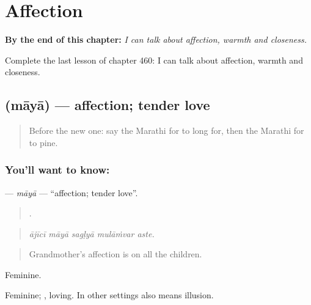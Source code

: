 
\chapter{Affection}
\label{ch:mr-affection}

\begin{chapteropening}
\textbf{By the end of this chapter:} \emph{I can talk about affection, warmth and closeness.}

Complete the last lesson of chapter 460: I can talk about affection, warmth and closeness.
\end{chapteropening}

\section[\texorpdfstring{\mr{माया} (māyā)}{माया (māyā)}]{ (māyā) — affection; tender love}

\label{lesson:MR-C460-maya}



\begin{quote}
Before the new one: say the Marathi for to long for, then the Marathi for to pine.
\end{quote}

\subsection*{You'll want to know: }
\textbf{} — \emph{māyā} — \textquotedblleft{}affection; tender love\textquotedblright{}.

\begin{quote}
    .
\end{quote}

\begin{quote}
\emph{ājīcī māyā sagḷyā mulāṁvar aste.}
\end{quote}

\begin{quote}
Grandmother's affection is on all the children.
\end{quote}

Feminine.

Feminine; , loving. In other settings  also means illusion.


